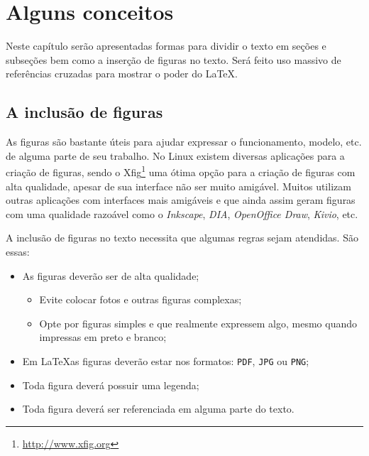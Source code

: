 
\chapter{Alguns conceitos}
\label{c_cap2}

Neste capítulo serão apresentadas formas para dividir o texto em seções e subseções bem como a inserção de figuras no texto. Será feito uso massivo de referências cruzadas para mostrar o poder do \LaTeX.

\section{A inclusão de figuras}
\label{s_c2_figuras}

As figuras são bastante úteis para ajudar expressar o funcionamento, modelo, etc. de alguma parte de seu trabalho. No Linux existem diversas aplicações para a criação de figuras, sendo o Xfig\footnote{\url{http://www.xfig.org}} uma ótima opção para a criação de figuras com alta qualidade, apesar de sua interface não ser muito amigável. Muitos utilizam outras aplicações com interfaces mais amigáveis e que ainda assim geram figuras com uma qualidade razoável como o \textit{Inkscape}, \textit{DIA}, \textit{OpenOffice Draw}, \textit{Kivio}, etc.

A inclusão de figuras no texto necessita que algumas regras sejam atendidas. São essas:

\begin{itemize}
	\item As figuras deverão ser de alta qualidade;
	\begin{itemize}
		\item Evite colocar fotos e outras figuras complexas;
		\item Opte por figuras simples e que realmente expressem algo, mesmo quando impressas em preto e branco;
	\end{itemize}
	\item Em \LaTeX as figuras deverão estar nos formatos: \texttt{PDF}, \texttt{JPG} ou \texttt{PNG};
	\item Toda figura deverá possuir uma legenda;
	\item Toda figura deverá ser referenciada em alguma parte do texto.
\end{itemize}

